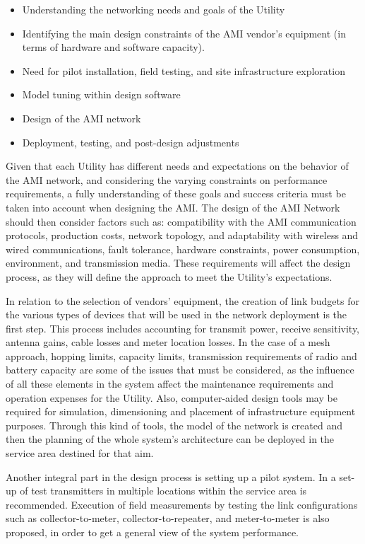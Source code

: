 \documentclass[11pt,draftclsnofoot,onecolumn]{IEEEtran}
\begin{document}
\begin{itemize}
\item Understanding the networking needs and goals of the Utility
\item Identifying the main design constraints of the AMI vendor's equipment (in terms of hardware and software capacity).
\item Need for pilot installation, field testing, and site infrastructure exploration
\item Model tuning within design software
\item Design of the AMI network 
\item Deployment, testing, and post-design adjustments
\end{itemize}
		
Given that each Utility has different needs and expectations on the behavior of the AMI network, and considering the varying constraints on performance requirements, a fully understanding of these goals and success criteria must be taken into account when designing the AMI. The design of the AMI Network should then consider factors such as: compatibility with the AMI communication protocols, production costs, network topology, and adaptability with wireless and wired communications, fault tolerance, hardware constraints, power consumption, environment, and transmission media. These requirements will affect the design process, as they will define the approach to meet the Utility’s expectations.

In relation to the selection of vendors' equipment, the creation of link budgets for the various types of devices that will be used in the network deployment is the first step. This process includes accounting for transmit power, receive sensitivity, antenna gains, cable losses and meter location losses. In the case of a mesh approach, hopping limits, capacity limits, transmission requirements of radio and battery capacity are some of the issues that must be considered, as the influence of all these elements in the system affect the maintenance requirements and operation expenses for the Utility. Also, computer-aided design tools may be required for simulation, dimensioning and placement of infrastructure equipment purposes.  Through this kind of tools, the model of the network is created and then the planning of the whole system’s architecture can be deployed in the service area destined for that aim. 

Another integral part in the design process is setting up a pilot system. In \cite{Leon2011}  a set-up of test transmitters in multiple locations within the service area is recommended. Execution of field measurements by testing the link configurations such as collector-to-meter, collector-to-repeater, and meter-to-meter is also proposed, in order to get a general view of the system performance.  
\end{document}
